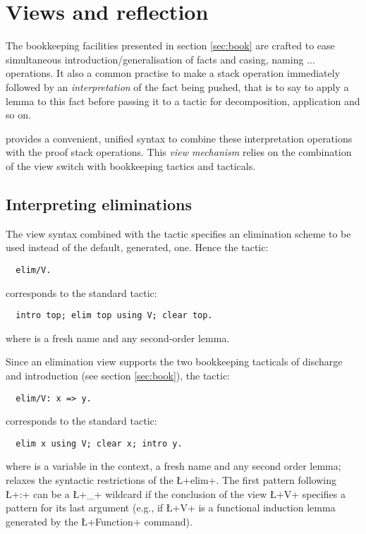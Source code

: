 \section{Views and reflection}\label{sec:views}

The bookkeeping facilities presented in section \ref{sec:book} are
crafted to ease simultaneous introduction/generalisation of facts and
casing,
naming ... operations. It also a common practise to make a stack
operation immediately followed by an \emph{interpretation} of the fact
being pushed,
that is to say to apply a lemma to this fact before passing it
to a tactic for decomposition, application and so on.




\ssr{} provides a convenient, unified syntax to combine these
interpretation operations with the proof stack operations. This
\emph{view mechanism} relies on the combination of the \C{/} view
switch with bookkeeping tactics and tacticals.

\subsection{Interpreting eliminations}

The view syntax combined with the  tactic specifies an
elimination scheme to
be used instead of the default, generated, one. Hence the \ssr{} tactic:
\begin{lstlisting}
  elim/V.
\end{lstlisting}
corresponds to the standard \Coq{} tactic:
\begin{lstlisting}
  intro top; elim top using V; clear top.
\end{lstlisting}
where  is a fresh name and  any second-order lemma.

Since an elimination view supports the two bookkeeping tacticals of
discharge and introduction (see section \ref{sec:book}), the \ssr{} tactic:
\begin{lstlisting}
  elim/V: x => y.
\end{lstlisting}
corresponds to the standard \Coq{} tactic:
\begin{lstlisting}
  elim x using V; clear x; intro y.
\end{lstlisting}
where  is a variable in the context,  a fresh name and 
any second order lemma; \ssr{} relaxes the syntactic restrictions of
the \Coq{} \L+elim+. The first pattern following \L+:+ can be a \L+_+
wildcard if the conclusion of the view \L+V+ specifies a pattern for
its last argument (e.g., if \L+V+ is a functional induction lemma
generated by the \L+Function+ command).

